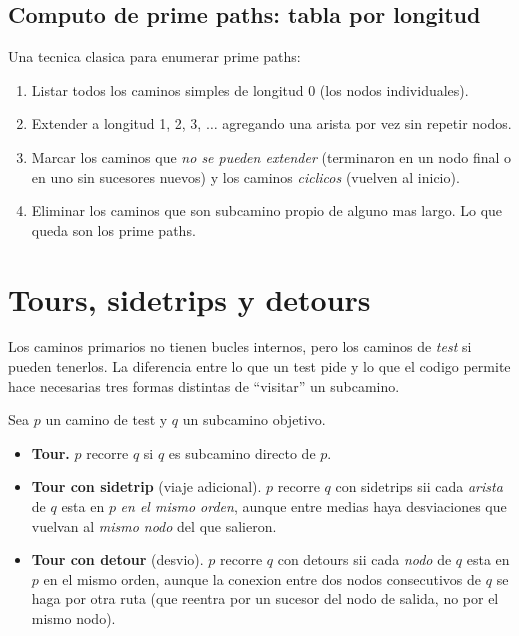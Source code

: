 \documentclass[12pt,a4paper]{article}
\begin{document}
\subsection{Computo de prime paths: tabla por longitud}

Una tecnica clasica para enumerar prime paths:
\begin{enumerate}
  \item Listar todos los caminos simples de longitud 0 (los nodos individuales).
  \item Extender a longitud 1, 2, 3, $\ldots$ agregando una arista por vez sin repetir nodos.
  \item Marcar los caminos que \emph{no se pueden extender} (terminaron en un nodo final o en
  uno sin sucesores nuevos) y los caminos \emph{ciclicos} (vuelven al inicio).
  \item Eliminar los caminos que son subcamino propio de alguno mas largo. Lo que queda son los
  prime paths.
\end{enumerate}

\section{Tours, sidetrips y detours}

Los caminos primarios no tienen bucles internos, pero los caminos de \emph{test} si pueden
tenerlos. La diferencia entre lo que un test pide y lo que el codigo permite hace necesarias
tres formas distintas de ``visitar'' un subcamino.

\begin{definicionbox}
Sea $p$ un camino de test y $q$ un subcamino objetivo.
\begin{itemize}
  \item \textbf{Tour.} $p$ recorre $q$ si $q$ es subcamino directo de $p$.
  \item \textbf{Tour con sidetrip} (viaje adicional). $p$ recorre $q$ con sidetrips sii cada
  \emph{arista} de $q$ esta en $p$ \emph{en el mismo orden}, aunque entre medias haya
  desviaciones que vuelvan al \emph{mismo nodo} del que salieron.
  \item \textbf{Tour con detour} (desvio). $p$ recorre $q$ con detours sii cada \emph{nodo} de
  $q$ esta en $p$ en el mismo orden, aunque la conexion entre dos nodos consecutivos de $q$ se
  haga por otra ruta (que reentra por un sucesor del nodo de salida, no por el mismo nodo).
\end{itemize}
\end{definicionbox}
\end{document}
